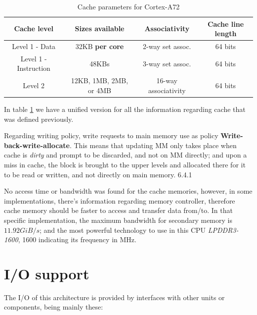 \begin{table}[H]
\caption{Cache parameters for Cortex-A72}
\begin{tabular}{|c|c|c|c|}
	
	\hline 
	Cache level & Sizes available & Associativity & Cache line length \\ 
	\hline 
	Level 1 - Data & 32KB \textbf{per core} & 2-way set assoc. & 64 bits \\ 
	\hline 
	Level 1 - Instruction & 48KBs & 3-way set assoc. &  64 bits \\ 
	\hline 
	Level 2 & 12KB, 1MB, 2MB, or 4MB & 16-way associativity & 64 bits \\ 
	\hline	
\end{tabular} 
\label{cachetable}
\end{table}

In table \ref{cachetable} we have a unified version for all the information regarding cache that was defined previously.

Regarding writing policy, write requests to main memory use as policy \textbf{ Write-back-write-allocate}. This means that updating MM only takes place when cache is \textit{dirty} and prompt to be discarded, and not on MM directly; and upon a miss in cache, the block is brought to the upper levels and allocated there for it to be read or written, and not directly on main memory.
\cite{cortexA72manual} 6.4.1

No access time or bandwidth was found for the cache memories, however, in some implementations, there's information regarding memory controller, therefore cache memory should be faster to access and transfer data from/to. In that specific implementation, the maximum bandwidth for secondary memory is $11.92 GiB/s$; and the most powerful technology to use in this CPU \textit{LPDDR3-1600}, 1600 indicating its frequency in MHz.\cite{mt6797}

\section{I/O support}
The I/O of this architecture is provided by  interfaces with other units or components, being mainly these:

